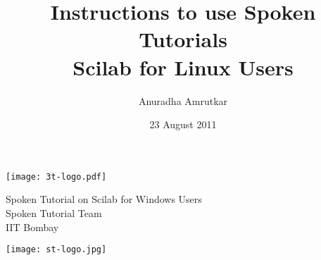 \documentclass[11pt]{article}
\title{Instructions to use Spoken Tutorials \\
Scilab for Linux Users}
\author{Anuradha Amrutkar}
\date{23 August 2011}
\begin{document}
\begin{minipage}[t]{0.15\textwidth}
\texttt{[image: 3t-logo.pdf]}
\end{minipage} \hfill
\begin{minipage}[t]{0.68\textwidth}
\begin{center}
\vspace{-0.7in}
\Large
Spoken Tutorial on Scilab for Windows Users \\
\large
Spoken Tutorial Team \\
IIT Bombay \\
\end{center}
\end{minipage} \hfill
\begin{minipage}[t]{0.12\textwidth}
\texttt{[image: st-logo.jpg]}
\end{minipage}
\end{document}
